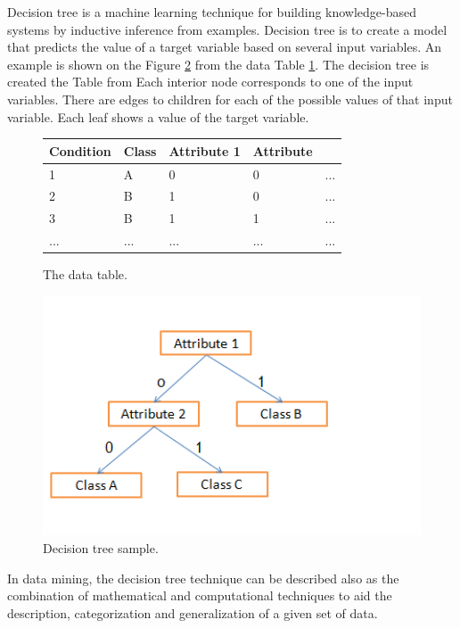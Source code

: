 Decision tree is a machine learning technique for building knowledge-based systems by inductive inference from examples. Decision tree is to create a model that predicts the value of a target variable based on several input variables. An example is shown on the Figure \ref{fig:decisiontreesample} from the data Table \ref{fig:decisiontreesampletable}. The decision tree is created the Table from Each interior node corresponds to one of the input variables. There are edges to children for each of the possible values of that input variable. Each leaf shows a value of the target variable.
\begin{figure}[h!]
  \begin{center}
    \begin{tabular}{ | l | l | l | l | l }
     \hline
    Condition & Class & Attribute 1 &  Attribute \\ \hline
    1 & A & 0 & 0 & ... \\ 
	2 & B & 1 & 0 & ... \\ 
	3 & B & 1 & 1 & ... \\ 
	... & ... & ... & ... & ... \\ 


    \end{tabular}
	\end{center}
     \caption{The data table.}
    \label{fig:decisiontreesampletable}
\end{figure} 
\begin{figure}[httb]
\centering
\includegraphics[width=1\textwidth]{graph/decisiontreesample.png}
\caption{Decision tree sample.}
\label{fig:decisiontreesample}
\end{figure}

In data mining, the decision tree technique can be described also as the combination of mathematical and computational techniques to aid the description, categorization and generalization of a given set of data.

